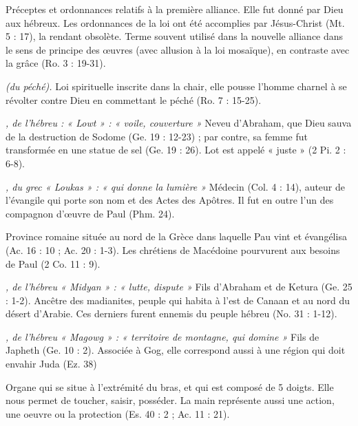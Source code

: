 \begin{multicols}{2}
\textit{}\newline
Préceptes et ordonnances relatifs à la première alliance. Elle fut donné par Dieu aux hébreux. Les ordonnances de la loi ont été accomplies par Jésus-Christ (Mt. 5 : 17), la rendant obsolète. Terme souvent utilisé dans la nouvelle alliance dans le sens de principe des œuvres (avec allusion à la loi mosaïque), en contraste avec la grâce (Ro. 3 : 19-31).

\textit{(du péché).}\newline
Loi spirituelle inscrite dans la chair, elle pousse l'homme charnel à se révolter contre Dieu en commettant le péché (Ro. 7 : 15-25).

\textit{, de l'hébreu : « Lowt » : « voile, couverture »}\newline
Neveu d'Abraham, que Dieu sauva de la destruction de Sodome (Ge. 19 : 12-23) ; par contre, sa femme fut transformée en une statue de sel (Ge. 19 : 26). Lot est appelé « juste » (2 Pi. 2 : 6-8).

\textit{, du grec « Loukas » : « qui donne la lumière »}\newline
Médecin (Col. 4 : 14), auteur de l'évangile qui porte son nom et des Actes des Apôtres. Il fut en outre l'un des compagnon d'œuvre de Paul (Phm. 24).

\textit{}\newline
Province romaine située au nord de la Grèce dans laquelle Pau vint et évangélisa (Ac. 16 : 10 ; Ac. 20 : 1-3). Les chrétiens de Macédoine pourvurent aux besoins de Paul (2 Co. 11 : 9).

\textit{, de l'hébreu « Midyan » : « lutte, dispute »}\newline
Fils d'Abraham et de Ketura (Ge. 25 : 1-2).
Ancêtre des madianites, peuple qui habita à l'est de Canaan et au nord du désert d'Arabie. Ces derniers furent ennemis du peuple hébreu (No. 31 : 1-12).

\textit{, de l'hébreu « Magowg » : « territoire de montagne, qui domine »}\newline
Fils de Japheth (Ge. 10 : 2). Associée à Gog, elle correspond aussi à une région qui doit envahir Juda (Ez. 38)

\textit{}\newline
Organe qui se situe à l'extrémité du bras, et qui est composé de 5 doigts. Elle nous permet de toucher, saisir, posséder. La main représente aussi une action, une oeuvre ou la protection (Es. 40 : 2 ; Ac. 11 : 21).


\end{multicols}
